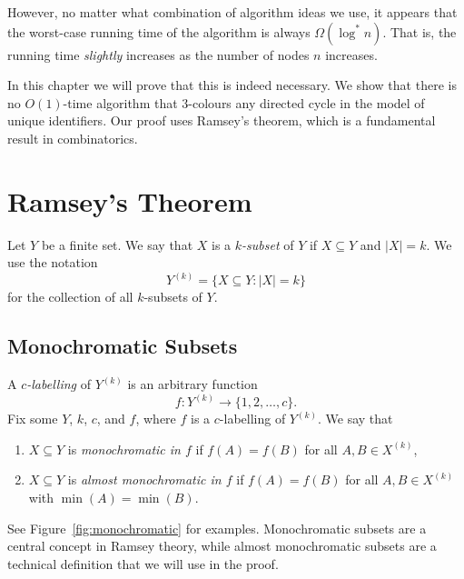 However, no matter what combination of algorithm ideas we use, it appears that the worst-case running time of the algorithm is always $\Omega(\log^* n)$. That is, the running time \emph{slightly} increases as the number of nodes $n$ increases.

In this chapter we will prove that this is indeed necessary. We show that there is no $O(1)$-time algorithm that $3$-colours any directed cycle in the model of unique identifiers. Our proof uses Ramsey's theorem, which is a fundamental result in combinatorics.


\section{Ramsey's Theorem}

Let $Y$ be a finite set. We say that $X$ is a \emph{$k$-subset} of $Y$ if $X \subseteq Y$ and $|X| = k$. We use the notation
\[
    Y^{(k)} = \{ X \subseteq Y : |X| = k \}
\]
for the collection of all $k$-subsets of $Y$.


\subsection{Monochromatic Subsets}

A \emph{$c$-labelling} of $Y^{(k)}$ is an arbitrary function
\[
    f \colon Y^{(k)} \to \{1,2,\dotsc,c\}.
\]
Fix some $Y$, $k$, $c$, and $f$, where $f$ is a $c$-labelling of $Y^{(k)}$. We say that
\begin{enumerate}
    \item $X \subseteq Y$ is \emph{monochromatic in $f$} if $f(A) = f(B)$ for all $A, B \in X^{(k)}$,
    \item $X \subseteq Y$ is \emph{almost monochromatic in $f$} if $f(A) = f(B)$ for all $A, B \in X^{(k)}$ with $\min(A) = \min(B)$.
\end{enumerate}
See Figure~\ref{fig:monochromatic} for examples. Monochromatic subsets are a central concept in Ramsey theory, while almost monochromatic subsets are a technical definition that we will use in the proof.

